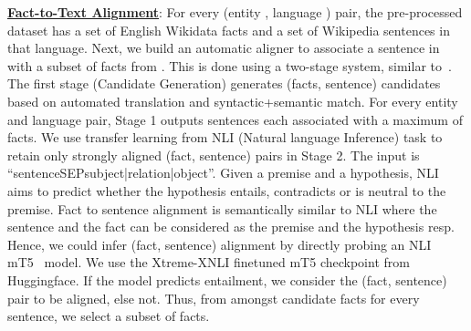 \documentclass[runningheads]{llncs}
\begin{document}
\noindent\underline{\textbf{Fact-to-Text Alignment}}:
For every (entity , language ) pair, the pre-processed dataset has a set  of English Wikidata facts and a set of Wikipedia sentences  in that language. Next, we build an automatic aligner to associate a sentence in  with a subset of facts from . This is done using a two-stage system, similar to~\cite{abhishek2022xalign}. The first stage (Candidate Generation) generates (facts, sentence) candidates based on automated translation and syntactic+semantic match. For every entity and language pair, Stage 1 outputs sentences each associated with a maximum of  facts. We use transfer learning from NLI (Natural language Inference) task to retain only strongly aligned (fact, sentence) pairs in Stage 2. The input is ``sentenceSEPsubject|relation|object''. Given a premise and a hypothesis, NLI aims to predict whether the hypothesis entails, contradicts or is neutral to the premise. Fact to sentence alignment is semantically similar to NLI where the sentence and the fact can be considered as the premise and the hypothesis resp. Hence, we could infer (fact, sentence) alignment by directly probing an NLI mT5~\cite{xue2021mt5} model. We use the Xtreme-XNLI finetuned mT5 checkpoint from Huggingface. If the model predicts entailment, we consider the (fact, sentence) pair to be aligned, else not. Thus, from amongst  candidate facts for every sentence, we select a subset of facts. 
\end{document}
